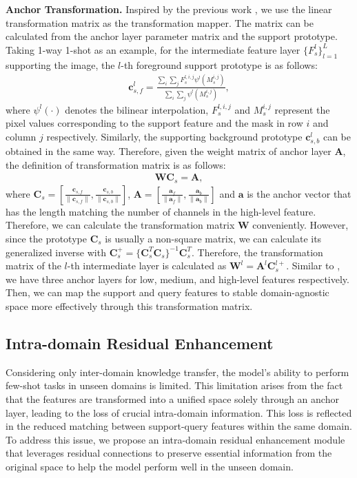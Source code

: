 \documentclass{bmvc2k}
\begin{document}
\textbf{Anchor Transformation. }Inspired by the previous work \cite{seo2022task, lei2022cross}, we use the linear transformation matrix as the transformation mapper. 
The matrix can be calculated from the anchor layer parameter matrix and the support prototype. 
Taking 1-way 1-shot as an example, for the intermediate feature layer $\{F^l_s\}_{l=1}^L$ supporting the image, the $l$-th foreground support prototype is as follows:
\begin{eqnarray}
\mathbf{c}^{l}_{s,f}=\frac{\sum_{i}\sum_{j}F^{l,i,j}_s\psi^l(M_{s}^{i,j})}{\sum_{i}\sum_{j}\psi^l(M_{s}^{i,j})},
\end{eqnarray}
where $\psi^l(\cdot)$ denotes the bilinear interpolation, $F^{l,i,j}_s$ and $M_{s}^{i,j}$ represent the pixel values corresponding to the support feature and the mask in row $i$ and column $j$ respectively. 
Similarly, the supporting background prototype $\mathbf{c}^{l}_{s,b}$ can be obtained in the same way. Therefore, given the weight matrix of anchor layer $\mathbf{A}$, the definition of transformation matrix is as follows:
\begin{eqnarray}\label{trans}
\mathbf{W}\mathbf{C}_s=\mathbf{A},
\end{eqnarray}
where $\mathbf{C}_s = \left[\frac{\mathbf{c}_{s,f}}{\|\mathbf{c}_{s,f}\|},\frac{\mathbf{c}_{s,b}}{\|\mathbf{c}_{s,b}\|}\right]$, $\mathbf{A} = \left[\frac{\mathbf{a}_{f}}{\|\mathbf{a}_{f}\|},\frac{\mathbf{a}_{b}}{\|\mathbf{a}_{b}\|}\right]$ and $\mathbf{a}$ is the anchor vector that has the length matching the number of channels in the high-level feature. 
Therefore, we can calculate the transformation matrix $\mathbf{W}$ conveniently. However, since the prototype $\mathbf{C}_s$ is usually a non-square matrix, we can calculate its generalized inverse \cite{ben2003generalized} with $\mathbf{C}^+_{s}=\{\mathbf{C}_{s }^T\mathbf{C}_{s}\}^{-1}\mathbf{C}^{T}_s$. 
Therefore, the transformation matrix of the $l$-th intermediate layer is calculated as
$\textbf{W}^l=\textbf{A}^l\textbf{C}^{l+}_s$.
Similar to \cite{lei2022cross}, we have three anchor layers for low, medium, and high-level features respectively.
Then, we can map the support and query features to stable domain-agnostic space more effectively through this transformation matrix.
\subsection{Intra-domain Residual Enhancement}\label{IRE}
Considering only inter-domain knowledge transfer, the model's ability to perform few-shot tasks in unseen domains is limited. 
This limitation arises from the fact that the features are transformed into a unified space solely through an anchor layer, leading to the loss of crucial intra-domain information. 
This loss is reflected in the reduced matching between support-query features within the same domain. 
To address this issue, we propose an intra-domain residual enhancement module that leverages residual connections to preserve essential information from the original space to help the model perform well in the unseen domain.
\end{document}
